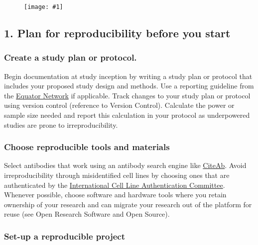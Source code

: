 \documentclass{article}
\newlength{\imgwidth}
\newcommand\scaledgraphics[2]{%
                
\settowidth{\imgwidth}{\texttt{[image: \#1]}}%
                
\setlength{\imgwidth}{\minof{\imgwidth}{#2\textwidth}}%
                
\texttt{[image: \#1]}%
                
}
\begin{document}
\begin{figure}
\scaledgraphics{2f511b07-692b-4316-98d9-4918bfd7c688.png}{1}
\label{F30251071}
\end{figure}


\subsection{\textbf{1. Plan for reproducibility before you start}}\label{1-plan-for-reproducibility-before-you-start}



\subsubsection{Create a study plan or protocol.}\label{create-a-study-plan-or-protocol}



Begin documentation at study inception by writing a study plan or protocol that includes your proposed study design and methods. Use a reporting guideline from the \href{http://www.equator-network.org/}{Equator Network} if applicable. Track changes to your study plan or protocol using version control (reference to Version Control). Calculate the power or sample size needed and report this calculation in your protocol as underpowered studies are prone to irreproducibility.


\subsubsection{Choose reproducible tools and materials}\label{choose-reproducible-tools-and-materials}



Select antibodies that work using an antibody search engine like \href{https://www.citeab.com/}{CiteAb}. Avoid irreproducibility through misidentified cell lines by choosing ones that are authenticated by the \href{http://iclac.org/}{International Cell Line Authentication Committee}. Whenever possible, choose software and hardware tools where you retain ownership of your research and can migrate your research out of the platform for reuse (see Open Research Software and Open Source).


\subsubsection{Set-up a reproducible project}\label{set-up-a-reproducible-project}
\end{document}
